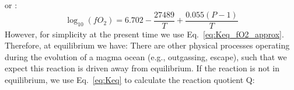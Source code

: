 or \citep{F91}:
\begin{equation}
    \log_{10}\left(fO_2\right) = 6.702-\frac{27489}{T} + \frac{0.055(P-1)}{T}
\end{equation}
However, for simplicity at the present time we use Eq.~\ref{eq:Keq_fO2_approx}.  Therefore, at equilibrium we have:
There are other physical processes operating during the evolution of a magma ocean (e.g., outgassing, escape), such that we expect this reaction is driven away from equilibrium.  If the reaction is not in equilibrium, we use Eq.~\ref{eq:Keq} to calculate the reaction quotient Q:
